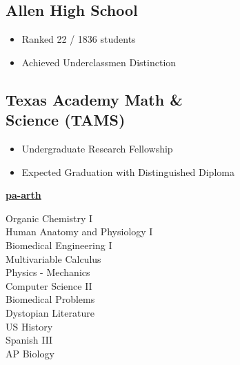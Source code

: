 \documentclass[a4paper]{MagicalCV}
\begin{document}

\begin{minipage}[t]{0.33\textwidth} 


\subsection{Allen High School}
\begin{itemize}
\item Ranked 22 / 1836 students
\item Achieved Underclassmen Distinction
\end{itemize}
\sectionsep

\subsection{Texas Academy Math \& \ \  \ \\  Science  (TAMS)}

 {}
\begin{itemize}
\item Undergraduate Research Fellowship
\item Expected Graduation with Distinguished Diploma
\end{itemize}
\sectionsep


 \href{https://github.com/pa-arth/pa-arth}{\bf pa-arth} \\

\sectionsep



Organic Chemistry I \\
Human Anatomy and Physiology I\\
Biomedical Engineering I \\
Multivariable Calculus \\
Physics - Mechanics \\
Computer Science II \\
Biomedical Problems \\
Dystopian Literature \\ 
US History \\
Spanish III \\
AP Biology \\


\end{minipage}
\end{document}
